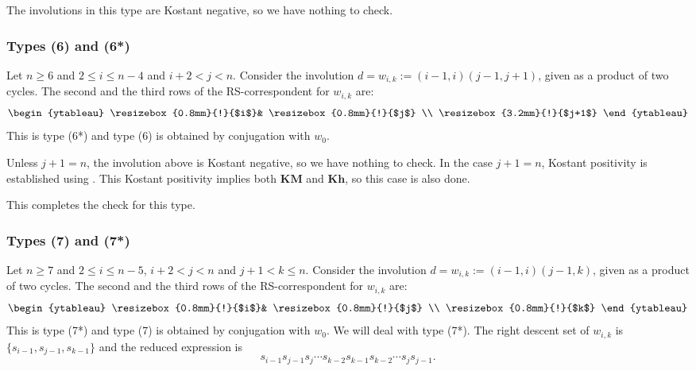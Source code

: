 \documentclass[a4paper]{amsart}
\begin{document}
The involutions in this type are Kostant negative, so we have nothing to check.


\subsubsection{Types (6) and (6*)}\label{s6.2.6}

Let $n\geq 6$ and $2\leq i\leq n-4$ and $i+2<j<n$. Consider the involution
$d=w_{i,k}:=(i-1,i)(j-1,j+1)$, given as a product of two cycles.
The second and the third rows of the RS-correspondent for $w_{i,k}$
are:
\begin{displaymath}
\begin{ytableau}
\resizebox{0.8mm}{!}{$i$}&
\resizebox{0.8mm}{!}{$j$}
\\
\resizebox{3.2mm}{!}{$j+1$} 
\end{ytableau}
\end{displaymath}
This is type (6*) and type (6) is obtained by
conjugation with $w_0$.

Unless $j+1=n$, the involution above is Kostant negative,
so we have nothing to check.
In the case $j+1=n$, Kostant positivity is established
using \cite[Theorem~1.1]{Kh}. This Kostant positivity 
implies both $\mathbf{KM}$ and $\mathbf{Kh}$,
so this case is also done.

This completes the check for this type.


\subsubsection{Types (7) and (7*)}\label{s6.2.7}

Let $n\geq 7$ and $2\leq i\leq n-5$, $i+2<j<n$ and $j+1<k\leq n$. Consider the involution
$d=w_{i,k}:=(i-1,i)(j-1,k)$, given as a product of two cycles.
The second and the third rows of the RS-correspondent for $w_{i,k}$
are:
\begin{displaymath}
\begin{ytableau}
\resizebox{0.8mm}{!}{$i$}&
\resizebox{0.8mm}{!}{$j$}
\\
\resizebox{0.8mm}{!}{$k$} 
\end{ytableau}
\end{displaymath}
This is type (7*) and type (7) is obtained by
conjugation with $w_0$.
We will deal with type (7*). The right descent set of 
$w_{i,k}$ is $\{s_{i-1},s_{j-1},s_{k-1}\}$ and the reduced expression is 
\begin{displaymath}
s_{i-1}s_{j-1}s_{j}\cdots s_{k-2}s_{k-1}s_{k-2}\cdots s_{j}s_{j-1}.
\end{displaymath}
\end{document}
